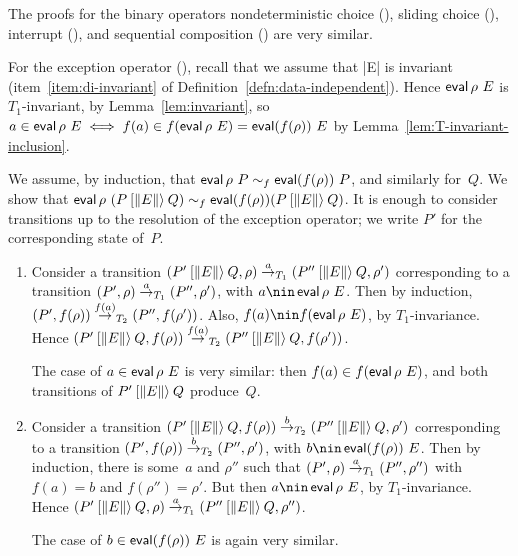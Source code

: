 
The proofs for the binary operators nondeterministic choice (\CSPM{_ \|~\|
_}), sliding choice (\CSPM{_ [> _}), interrupt (\CSPM{_ /\\ _}), and
sequential composition (\CSPM{_ ; _}) are very similar.



For the exception operator (\CSPM{_ [\| E \|> _}), recall that we assume that
|E| is invariant (item~\ref{item:di-invariant} of
Definition~\ref{defn:data-independent}).  Hence $\mathop{\sf eval} \rho~E$ is
$T_1$-invariant, by Lemma~\ref{lem:invariant}, so $a \in \mathop{\sf eval} \rho~E \iff
f(a) \in f(\mathop{\sf eval} \rho~E) = \mathop{\sf eval} (f(\rho))~E$ by
Lemma~\ref{lem:T-invariant-inclusion}.

We assume, by induction, that $\mathop{\sf eval} \rho~P \sim_f \mathop{\sf eval} (f(\rho))~P$, and
similarly for~$Q$.  We show that $\mathop{\sf eval} \rho~(P \mathbin{[\|E\|\rangle} Q) \sim_f \mathop{\sf eval}
(f(\rho)) (P \mathbin{[\|E\|\rangle} Q)$.  It is enough to consider transitions up to the
resolution of the exception operator; we write $P'$ for the corresponding
state of~$P$.
%
\begin{enumerate}
\item Consider a transition $(P' \mathbin{[\|E\|\rangle} Q, \rho) \stackrel{a}{\rightarrow}_{T_1}
(P'' \mathbin{[\|E\|\rangle} Q, \rho')$ corresponding to a transition
$(P', \rho) \stackrel{a}{\rightarrow}_{T_1} (P'', \rho')$, with $a \nin \eval \rho~E$.  Then
by induction, $(P', f(\rho)) \stackrel{f(a)}{\rightarrow}_{T_2} (P'', f(\rho'))$.  Also,
$f(a) \nin f(\eval \rho~E)$, by $T_1$-invariance.  Hence $(P' \mathbin{[\|E\|\rangle} Q,
f(\rho)) \stackrel{f(a)}{\rightarrow}_{T_2} (P'' \mathbin{[\|E\|\rangle} Q, f(\rho'))$.

The case of $a \in \mathop{\sf eval} \rho~E$ is very similar: then $f(a) \in
f(\mathop{\sf eval} \rho~E)$, and both transitions of $P' \mathbin{[\|E\|\rangle} Q$ produce~$Q$.

\item Consider a transition $(P' \mathbin{[\|E\|\rangle} Q, f(\rho)) \stackrel{b}{\rightarrow}_{T_2}
(P'' \mathbin{[\|E\|\rangle} Q, \rho')$ corresponding to a transition $(P',
f(\rho)) \stackrel{b}{\rightarrow}_{T_2} (P'', \rho')$, with $b \nin \eval (f(\rho))~E$.  Then
by induction, there is some~$a$ and $\rho''$ such that
$(P', \rho) \stackrel{a}{\rightarrow}_{T_1} (P'', \rho'')$ with $f(a) = b$ and $f(\rho'')
= \rho'$.  But then $a \nin \eval \rho~E$, by $T_1$-invariance.  Hence
$(P' \mathbin{[\|E\|\rangle} Q, \rho) \stackrel{a}{\rightarrow}_{T_1} (P'' \mathbin{[\|E\|\rangle} Q, \rho'')$.

The case of $b \in \mathop{\sf eval} (f(\rho))~E$ is again very similar.
\end{enumerate}


